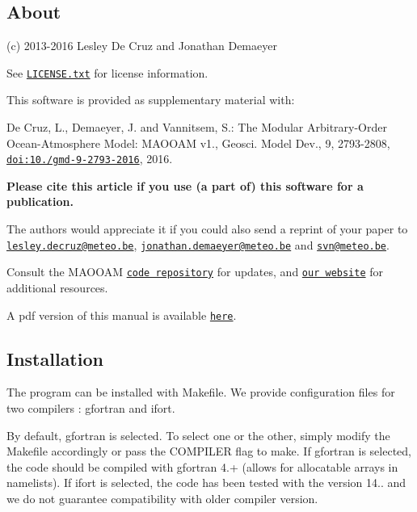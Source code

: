 \subsection*{About}

(c) 2013-\/2016 Lesley De Cruz and Jonathan Demaeyer

See \href{../LICENSE.txt}{\tt L\+I\+C\+E\+N\+S\+E.\+txt} for license information.

This software is provided as supplementary material with\+:


\begin{DoxyItemize}
\item De Cruz, L., Demaeyer, J. and Vannitsem, S.\+: The Modular Arbitrary-\/\+Order Ocean-\/\+Atmosphere Model\+: M\+A\+O\+O\+AM v1., Geosci. Model Dev., 9, 2793-\/2808, \href{http://dx.doi.org/10.5194/gmd-9-2793-2016}{\tt doi\+:10./gmd-\/9-\/2793-\/2016}, 2016.
\end{DoxyItemize}

{\bfseries Please cite this article if you use (a part of) this software for a publication.}

The authors would appreciate it if you could also send a reprint of your paper to \href{mailto:lesley.decruz@meteo.be}{\tt lesley.\+decruz@meteo.\+be}, \href{mailto:jonathan.demaeyer@meteo.be}{\tt jonathan.\+demaeyer@meteo.\+be} and \href{mailto:svn@meteo.be}{\tt svn@meteo.\+be}.

Consult the M\+A\+O\+O\+AM \href{http://www.github.com/Climdyn/MAOOAM}{\tt code repository} for updates, and \href{http://climdyn.meteo.be}{\tt our website} for additional resources.

A pdf version of this manual is available \href{../latex/Reference_manual.pdf}{\tt here}. 



\subsection*{Installation}

The program can be installed with Makefile. We provide configuration files for two compilers \+: gfortran and ifort.

By default, gfortran is selected. To select one or the other, simply modify the Makefile accordingly or pass the C\+O\+M\+P\+I\+L\+ER flag to {\ttfamily make}. If gfortran is selected, the code should be compiled with gfortran 4.+ (allows for allocatable arrays in namelists). If ifort is selected, the code has been tested with the version 14.. and we do not guarantee compatibility with older compiler version.

